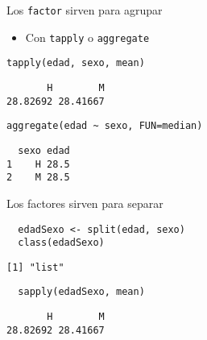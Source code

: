 \documentclass[xcolor={usenames,svgnames,dvipsnames}]{beamer}
\begin{document}
\begin{frame}[fragile,label=sec-1-4]{Los \texttt{factor} sirven para agrupar}
 \begin{itemize}
\item Con \texttt{tapply} o \texttt{aggregate}
\end{itemize}
\lstset{language=R,label= ,caption= ,numbers=none}
\begin{lstlisting}
tapply(edad, sexo, mean)
\end{lstlisting}

\begin{verbatim}
       H        M 
28.82692 28.41667
\end{verbatim}

\lstset{language=R,label= ,caption= ,numbers=none}
\begin{lstlisting}
aggregate(edad ~ sexo, FUN=median)
\end{lstlisting}

\begin{verbatim}
  sexo edad
1    H 28.5
2    M 28.5
\end{verbatim}
\end{frame}

\begin{frame}[fragile,label=sec-1-5]{Los factores sirven para separar}
 \lstset{language=R,label= ,caption= ,numbers=none}
\begin{lstlisting}
  edadSexo <- split(edad, sexo)
  class(edadSexo)
\end{lstlisting}

\begin{verbatim}
[1] "list"
\end{verbatim}

\lstset{language=R,label= ,caption= ,numbers=none}
\begin{lstlisting}
  sapply(edadSexo, mean)
\end{lstlisting}

\begin{verbatim}
       H        M 
28.82692 28.41667
\end{verbatim}
\end{frame}
\end{document}
